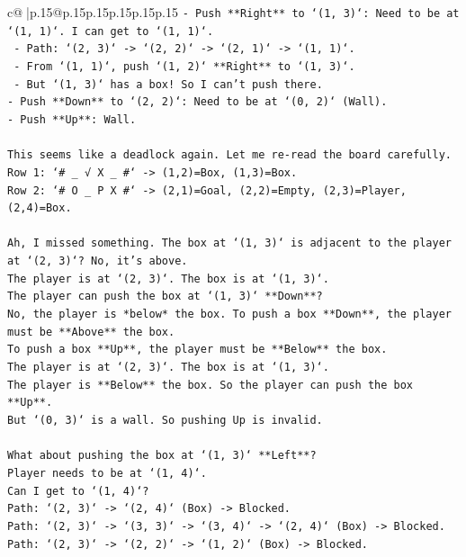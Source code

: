 \documentclass{article}
\begin{document}
{\begin{supertabular}{c@{$\;$}|p{.15\linewidth}@{}p{.15\linewidth}p{.15\linewidth}p{.15\linewidth}p{.15\linewidth}p{.15\linewidth}}
{{{\texttt{{-} Push **Right** to `(1, 3)`: Need to be at `(1, 1)`. I can get to `(1, 1)`.} \\
\texttt{  {-} Path: `(2, 3)` {-}> `(2, 2)` {-}> `(2, 1)` {-}> `(1, 1)`.} \\
\texttt{  {-} From `(1, 1)`, push `(1, 2)` **Right** to `(1, 3)`.} \\
\texttt{  {-} But `(1, 3)` has a box! So I can't push there.} \\
\texttt{{-} Push **Down** to `(2, 2)`: Need to be at `(0, 2)` (Wall).} \\
\texttt{{-} Push **Up**: Wall.} \\
\\ 
\texttt{This seems like a deadlock again. Let me re{-}read the board carefully.} \\
\texttt{Row 1: `\# \_ √ X \_ \#` {-}> (1,2)=Box, (1,3)=Box.} \\
\texttt{Row 2: `\# O \_ P X \#` {-}> (2,1)=Goal, (2,2)=Empty, (2,3)=Player, (2,4)=Box.} \\
\\ 
\texttt{Ah, I missed something. The box at `(1, 3)` is adjacent to the player at `(2, 3)`? No, it's above.} \\
\texttt{The player is at `(2, 3)`. The box is at `(1, 3)`.} \\
\texttt{The player can push the box at `(1, 3)` **Down**?} \\
\texttt{No, the player is *below* the box. To push a box **Down**, the player must be **Above** the box.} \\
\texttt{To push a box **Up**, the player must be **Below** the box.} \\
\texttt{The player is at `(2, 3)`. The box is at `(1, 3)`.} \\
\texttt{The player is **Below** the box. So the player can push the box **Up**.} \\
\texttt{But `(0, 3)` is a wall. So pushing Up is invalid.} \\
\\ 
\texttt{What about pushing the box at `(1, 3)` **Left**?} \\
\texttt{Player needs to be at `(1, 4)`.} \\
\texttt{Can I get to `(1, 4)`?} \\
\texttt{Path: `(2, 3)` {-}> `(2, 4)` (Box) {-}> Blocked.} \\
\texttt{Path: `(2, 3)` {-}> `(3, 3)` {-}> `(3, 4)` {-}> `(2, 4)` (Box) {-}> Blocked.} \\
\texttt{Path: `(2, 3)` {-}> `(2, 2)` {-}> `(1, 2)` (Box) {-}> Blocked.} \\
}}}
\end{supertabular}}
\end{document}
